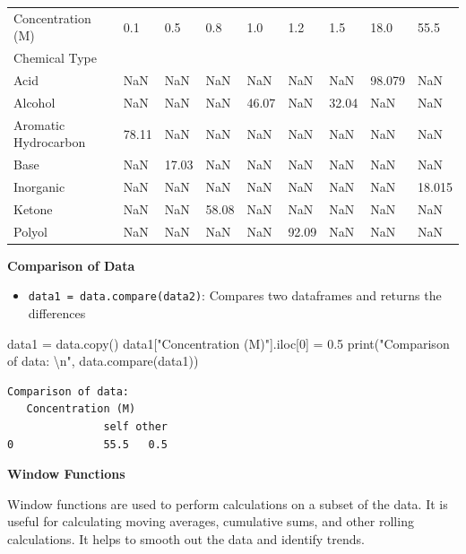 \documentclass[
  letterpaper,
  DIV=11,
  numbers=noendperiod]{scrreprt}
\newenvironment{Shaded}{\begin{snugshade}}{\end{snugshade}}
\newcommand{\BuiltInTok}[1]{\textcolor[rgb]{0.00,0.23,0.31}{#1}}
\newcommand{\CharTok}[1]{\textcolor[rgb]{0.13,0.47,0.30}{#1}}
\newcommand{\DecValTok}[1]{\textcolor[rgb]{0.68,0.00,0.00}{#1}}
\newcommand{\FloatTok}[1]{\textcolor[rgb]{0.68,0.00,0.00}{#1}}
\newcommand{\NormalTok}[1]{\textcolor[rgb]{0.00,0.23,0.31}{#1}}
\newcommand{\OperatorTok}[1]{\textcolor[rgb]{0.37,0.37,0.37}{#1}}
\newcommand{\StringTok}[1]{\textcolor[rgb]{0.13,0.47,0.30}{#1}}
\providecommand{\tightlist}{%
  \setlength{\itemsep}{0pt}\setlength{\parskip}{0pt}}\usepackage{longtable,booktabs,array}
\begin{document}
\begin{longtable}[]{@{}lllllllll@{}}
\toprule\noalign{}
Concentration (M) & 0.1 & 0.5 & 0.8 & 1.0 & 1.2 & 1.5 & 18.0 & 55.5 \\
Chemical Type & & & & & & & & \\
\midrule\noalign{}
\endhead
\bottomrule\noalign{}
\endlastfoot
Acid & NaN & NaN & NaN & NaN & NaN & NaN & 98.079 & NaN \\
Alcohol & NaN & NaN & NaN & 46.07 & NaN & 32.04 & NaN & NaN \\
Aromatic Hydrocarbon & 78.11 & NaN & NaN & NaN & NaN & NaN & NaN &
NaN \\
Base & NaN & 17.03 & NaN & NaN & NaN & NaN & NaN & NaN \\
Inorganic & NaN & NaN & NaN & NaN & NaN & NaN & NaN & 18.015 \\
Ketone & NaN & NaN & 58.08 & NaN & NaN & NaN & NaN & NaN \\
Polyol & NaN & NaN & NaN & NaN & 92.09 & NaN & NaN & NaN \\
\end{longtable}

\textbf{Comparison of Data}

\begin{itemize}
\tightlist
\item
  \texttt{data1\ =\ data.compare(data2)}: Compares two dataframes and
  returns the differences
\end{itemize}

\begin{Shaded}
\begin{Highlighting}[]
\NormalTok{data1 }\OperatorTok{=}\NormalTok{ data.copy()}
\NormalTok{data1[}\StringTok{"Concentration (M)"}\NormalTok{].iloc[}\DecValTok{0}\NormalTok{] }\OperatorTok{=} \FloatTok{0.5}
\BuiltInTok{print}\NormalTok{(}\StringTok{"Comparison of data: }\CharTok{\textbackslash{}n}\StringTok{"}\NormalTok{, }
\NormalTok{data.compare(data1))}
\end{Highlighting}
\end{Shaded}

\begin{verbatim}
Comparison of data: 
   Concentration (M)      
               self other
0              55.5   0.5
\end{verbatim}

\textbf{Window Functions}

Window functions are used to perform calculations on a subset of the
data. It is useful for calculating moving averages, cumulative sums, and
other rolling calculations. It helps to smooth out the data and identify
trends.
\end{document}
